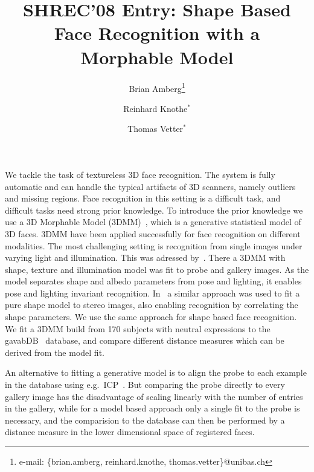 \documentclass{vgtc}                          %
\title{SHREC'08 Entry: Shape Based Face Recognition with a Morphable Model}
\author{Brian Amberg\thanks{e-mail: \{brian.amberg, reinhard.knothe, thomas.vetter\}@unibas.ch} %
        \and Reinhard Knothe$^*$%
	\and Thomas Vetter$^*$}%
\begin{document}


\maketitle

We tackle the task of textureless 3D face recognition. The system is fully
automatic and can handle the typical artifacts of 3D scanners, namely outliers
and missing regions. Face recognition in this setting is a difficult task, and
difficult tasks need strong prior knowledge. To introduce the prior knowledge
we use a 3D Morphable Model (3DMM)~\cite{blanz:model}, which is a generative
statistical model of 3D faces. 3DMM have been applied successfully for face
recognition on different modalities. The most challenging setting is
recognition from single images under varying light and illumination.  This was
adressed by~\cite{blanz03:face_rec,romdhani:recognition}. There a 3DMM with
shape, texture and illumination model was fit to probe and gallery images.  As
the model separates shape and albedo parameters from pose and lighting, it
enables pose and lighting invariant recognition.  In~\cite{amberg07:stereo} a
similar approach was used to fit a pure shape model to stereo images, also
enabling recognition by correlating the shape parameters. We use the same
approach for shape based face recognition. We fit a 3DMM build from 170
subjects with neutral expressions to the \hbox{gavabDB}~\cite{gavabdb} database, and
compare different distance measures which can be derived from the model fit.

An alternative to fitting a generative model is to align the probe to each
example in the database using e.g.\ ICP~\cite{bowyer05:icp_recognition}. But
comparing the probe directly to every gallery image has the disadvantage of
scaling linearly with the number of entries in the gallery, while for a model
based approach only a single fit to the probe is necessary, and the comparision
to the database can then be performed by a distance measure in the lower
dimensional space of registered faces.
\end{document}
